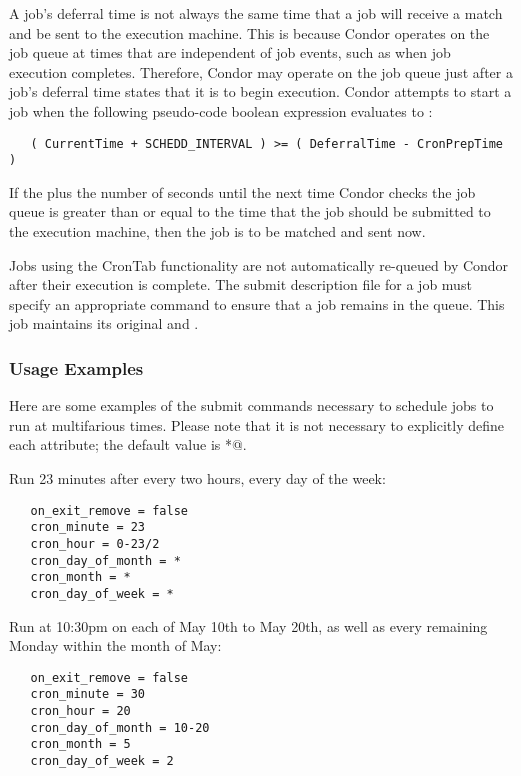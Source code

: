 A job's deferral time is not always the same time that a job 
will receive a match and be sent to the execution machine. 
This is because Condor operates on the job queue
at times that are independent of job events,
such as when job execution completes.
Therefore,
Condor may operate on the job queue just after 
a job's deferral time states that it is to begin execution. 
Condor attempts to start a job when the 
following pseudo-code boolean expression evaluates to :

\footnotesize
\begin{verbatim}
   ( CurrentTime + SCHEDD_INTERVAL ) >= ( DeferralTime - CronPrepTime )
\end{verbatim}
\normalsize

If the  plus the number of seconds 
until the next time Condor checks 
the job queue is greater than or equal to the time that the job 
should be submitted to the execution machine, 
then the job is to be matched and sent now.

Jobs using the CronTab functionality are not automatically 
re-queued by Condor after their execution is complete. 
The submit description file for a job
must specify an appropriate  
command to ensure that a job remains in the queue. 
This job maintains its original  and .

\subsubsection{Usage Examples}
\label{sec:crontab-examples}

Here are some examples of the submit commands
necessary to schedule jobs to run at multifarious times. 
Please note that it is not necessary to 
explicitly define each attribute; the default value is \verb@*@.

Run 23 minutes after every two hours, every day of the week:

\begin{verbatim}
   on_exit_remove = false
   cron_minute = 23
   cron_hour = 0-23/2
   cron_day_of_month = *
   cron_month = *
   cron_day_of_week = *
\end{verbatim}

Run at 10:30pm on each of May 10th to May 20th, as well as every 
remaining Monday within the month of May:

\begin{verbatim}
   on_exit_remove = false
   cron_minute = 30
   cron_hour = 20
   cron_day_of_month = 10-20
   cron_month = 5
   cron_day_of_week = 2
\end{verbatim}

